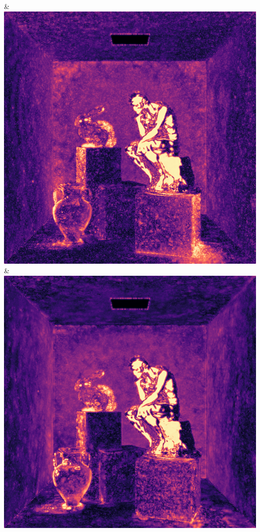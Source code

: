 & \includegraphics[width=\linewidth]{figures/py/tests/sppc_optimization/nrc+sppc+Rej70+RejN_1spp_thinker_flip.png}
& \includegraphics[width=\linewidth]{figures/py/tests/sppc_optimization/nrc+sppc14@1_1spp_thinker_flip.png}
